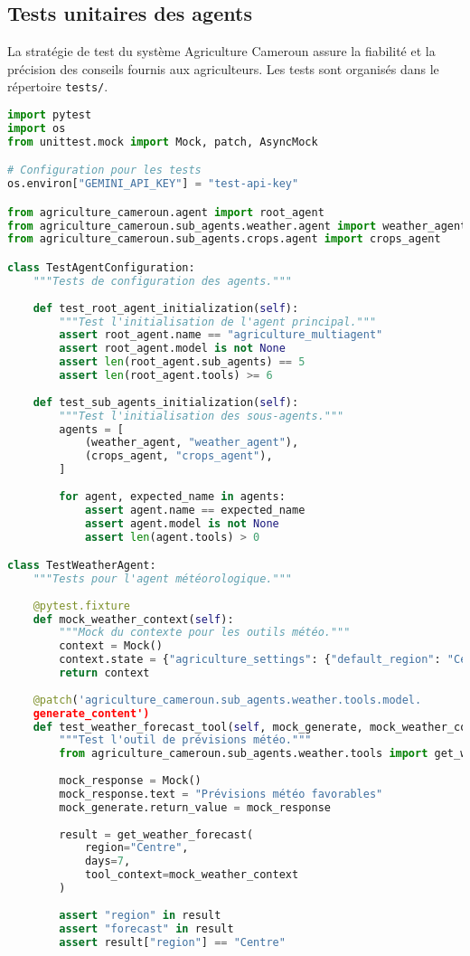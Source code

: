 \subsection{Tests unitaires des agents}

La stratégie de test du système Agriculture Cameroun assure la fiabilité et la précision des conseils fournis aux agriculteurs. Les tests sont organisés dans le répertoire \texttt{tests/}.

\begin{lstlisting}[language=Python, caption=Tests unitaires réels du projet (tests/test\_agents.py)]
import pytest
import os
from unittest.mock import Mock, patch, AsyncMock

# Configuration pour les tests
os.environ["GEMINI_API_KEY"] = "test-api-key"

from agriculture_cameroun.agent import root_agent
from agriculture_cameroun.sub_agents.weather.agent import weather_agent
from agriculture_cameroun.sub_agents.crops.agent import crops_agent

class TestAgentConfiguration:
    """Tests de configuration des agents."""
    
    def test_root_agent_initialization(self):
        """Test l'initialisation de l'agent principal."""
        assert root_agent.name == "agriculture_multiagent"
        assert root_agent.model is not None
        assert len(root_agent.sub_agents) == 5
        assert len(root_agent.tools) >= 6
    
    def test_sub_agents_initialization(self):
        """Test l'initialisation des sous-agents."""
        agents = [
            (weather_agent, "weather_agent"),
            (crops_agent, "crops_agent"),
        ]
        
        for agent, expected_name in agents:
            assert agent.name == expected_name
            assert agent.model is not None
            assert len(agent.tools) > 0

class TestWeatherAgent:
    """Tests pour l'agent météorologique."""
    
    @pytest.fixture
    def mock_weather_context(self):
        """Mock du contexte pour les outils météo."""
        context = Mock()
        context.state = {"agriculture_settings": {"default_region": "Centre"}}
        return context
    
    @patch('agriculture_cameroun.sub_agents.weather.tools.model.
    generate_content')
    def test_weather_forecast_tool(self, mock_generate, mock_weather_context):
        """Test l'outil de prévisions météo."""
        from agriculture_cameroun.sub_agents.weather.tools import get_weather_forecast
        
        mock_response = Mock()
        mock_response.text = "Prévisions météo favorables"
        mock_generate.return_value = mock_response
        
        result = get_weather_forecast(
            region="Centre",
            days=7,
            tool_context=mock_weather_context
        )
        
        assert "region" in result
        assert "forecast" in result
        assert result["region"] == "Centre"
\end{lstlisting}

